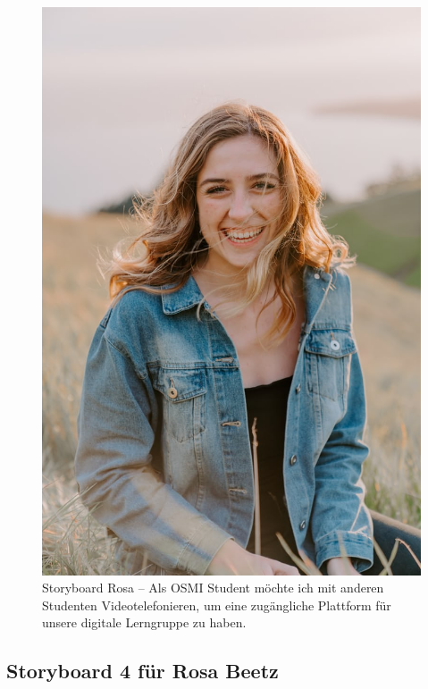 \documentclass{article}
\begin{document}
\begin{figure}[h]
	\includegraphics[angle=90,width=\textwidth]{rosa}
	\centering
	\caption{Storyboard Rosa – Als OSMI Student möchte ich mit anderen Studenten Videotelefonieren, um eine zugängliche Plattform für unsere digitale Lerngruppe zu haben.}
\end{figure}

\newpage

\subsection{Storyboard 4 für Rosa Beetz}
\end{document}
